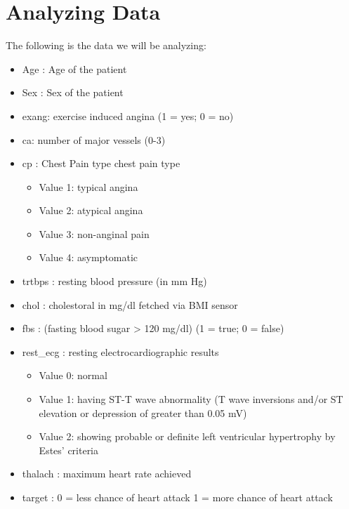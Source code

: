 \documentclass[11pt, oneside]{article}
\begin{document}
\section*{Analyzing Data}
The following is the data we will be analyzing:
\begin{itemize}
    \item Age : Age of the patient

    \item Sex : Sex of the patient

    \item exang: exercise induced angina (1 = yes; 0 = no)

    \item ca: number of major vessels (0-3)

    \item cp : Chest Pain type chest pain type
    \begin{itemize}
        \item Value 1: typical angina 
        \item Value 2: atypical angina 
        \item Value 3: non-anginal pain 
        \item Value 4: asymptomatic
    \end{itemize}
    
    \item trtbps : resting blood pressure (in mm Hg)
    
    \item chol : cholestoral in mg/dl fetched via BMI sensor
    
    \item fbs : (fasting blood sugar > 120 mg/dl) (1 = true; 0 = false)
    
    \item rest\_ecg : resting electrocardiographic results
    \begin{itemize}
        \item Value 0: normal 
        \item Value 1: having ST-T wave abnormality (T wave inversions and/or ST elevation or depression of greater than 0.05 mV) 
        \item Value 2: showing probable or definite left ventricular hypertrophy by Estes' criteria 
    \end{itemize}
    
    \item thalach : maximum heart rate achieved
    
    \item target : 0 = less chance of heart attack 1 = more chance of heart attack
\end{itemize}
\end{document}

